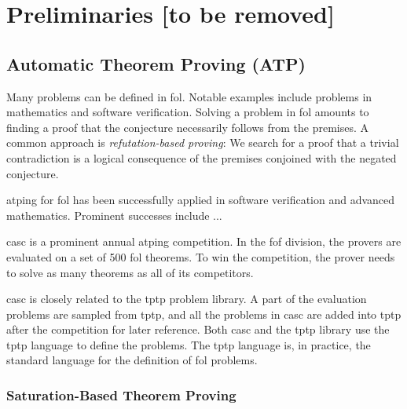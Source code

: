 \newcommand{\defn}\emph


\chapter{Preliminaries [to be removed]}

\section{Automatic Theorem Proving (ATP)}

Many problems can be defined in \gls{fol}.
Notable examples include problems in mathematics and software verification.
Solving a problem in \gls{fol} amounts to finding a proof that the conjecture necessarily follows from the premises.
A common approach is \defn{refutation-based proving}:
We search for a proof that a trivial contradiction is a logical consequence of the premises conjoined with the negated conjecture.

\Gls{atping} for \gls{fol} has been successfully applied in software verification and advanced mathematics.
Prominent successes include ...

\Gls{casc} is a prominent annual \gls{atping} competition.
In the \gls{fof} division, the provers are evaluated on a set of 500 \gls{fol} theorems.
To win the competition, the prover needs to solve as many theorems as all of its competitors.

\Gls{casc} is closely related to the \gls{tptp} problem library.
A part of the evaluation problems are sampled from \gls{tptp}, and all the problems in \gls{casc} are added into \gls{tptp} after the competition for later reference.
Both \gls{casc} and the \gls{tptp} library use the \gls{tptp} language to define the problems.
The \gls{tptp} language is, in practice, the standard language for the definition of \gls{fol} problems.

\subsection{Saturation-Based Theorem Proving}

